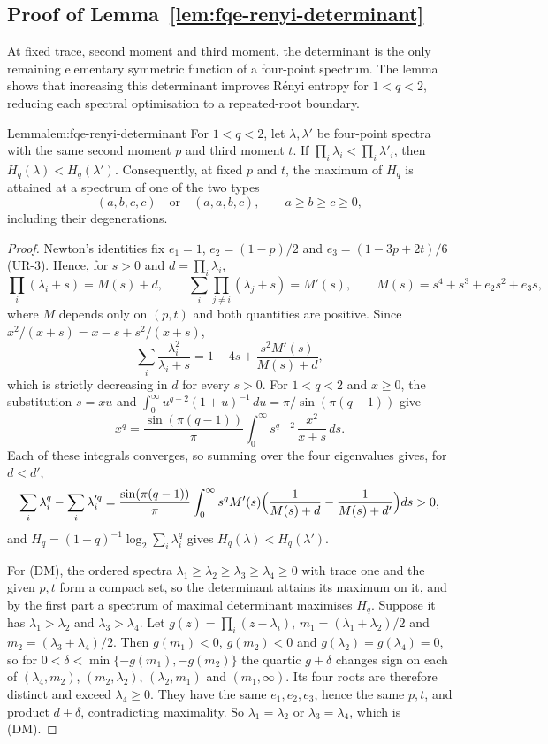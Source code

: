 \subsection{Proof of Lemma~\ref{lem:fqe-renyi-determinant}}\label{sec:sup-determinant}
At fixed trace, second moment and third moment, the determinant is the only
remaining elementary symmetric function of a four-point spectrum. The lemma
shows that increasing this determinant improves R\'enyi entropy for
$1<q<2$, reducing each spectral optimisation to a repeated-root boundary.
\begin{restated}{Lemma}{lem:fqe-renyi-determinant}
For $1<q<2$, let $\lambda,\lambda'$ be four-point spectra with the same second moment $p$ and third moment $t$.
If $\prod_i\lambda_i<\prod_i\lambda'_i$, then $H_q(\lambda)<H_q(\lambda')$.
Consequently, at fixed $p$ and $t$, the maximum of $H_q$ is attained at a spectrum of one of the two types
\[
(a,b,c,c)\quad\text{or}\quad(a,a,b,c),
\qquad a\ge b\ge c\ge0,
\tag{DM}
\]
including their degenerations.
\end{restated}
\begin{proof}
Newton's identities fix $e_1=1$, $e_2=(1-p)/2$ and $e_3=(1-3p+2t)/6$ (UR-3). Hence, for $s>0$ and $d=\prod_i\lambda_i$,
\[
 \prod_i(\lambda_i+s)=M(s)+d,\qquad \sum_i\prod_{j\ne i}(\lambda_j+s)=M'(s),\qquad M(s)=s^4+s^3+e_2s^2+e_3s,
\]
where $M$ depends only on $(p,t)$ and both quantities are positive. Since $x^2/(x+s)=x-s+s^2/(x+s)$,
\[
 \sum_i\frac{\lambda_i^2}{\lambda_i+s}=1-4s+\frac{s^2M'(s)}{M(s)+d},
\]
which is strictly decreasing in $d$ for every $s>0$. For $1<q<2$ and $x\ge0$, the substitution $s=xu$ and
$\int_0^\infty u^{q-2}(1+u)^{-1}\,du=\pi/\sin(\pi(q-1))$ give
\[
 x^q=\frac{\sin(\pi(q-1))}{\pi}\int_0^\infty s^{q-2}\,\frac{x^2}{x+s}\,ds .
\]
Each of these integrals converges, so summing over the four eigenvalues gives, for $d<d'$,
\[
 \sum_i\lambda_i^q-\sum_i\lambda_i'^q=\frac{\sin(\pi(q-1))}{\pi}\int_0^\infty s^{q}M'(s)
 \Bigl(\frac1{M(s)+d}-\frac1{M(s)+d'}\Bigr)ds>0,
\]
and $H_q=(1-q)^{-1}\log_2\sum_i\lambda_i^q$ gives $H_q(\lambda)<H_q(\lambda')$.

For (DM), the ordered spectra $\lambda_1\ge\lambda_2\ge\lambda_3\ge\lambda_4\ge0$ with trace one and the given $p,t$
form a compact set, so the determinant attains its maximum on it, and by the first part a spectrum of maximal
determinant maximises $H_q$. Suppose it has $\lambda_1>\lambda_2$ and $\lambda_3>\lambda_4$. Let
$g(z)=\prod_i(z-\lambda_i)$, $m_1=(\lambda_1+\lambda_2)/2$ and $m_2=(\lambda_3+\lambda_4)/2$. Then $g(m_1)<0$,
$g(m_2)<0$ and $g(\lambda_2)=g(\lambda_4)=0$, so for $0<\delta<\min\{-g(m_1),-g(m_2)\}$ the quartic $g+\delta$ changes
sign on each of $(\lambda_4,m_2)$, $(m_2,\lambda_2)$, $(\lambda_2,m_1)$ and $(m_1,\infty)$. Its four roots are therefore
distinct and exceed $\lambda_4\ge0$. They have the same $e_1,e_2,e_3$, hence the same $p,t$, and product $d+\delta$,
contradicting maximality. So $\lambda_1=\lambda_2$ or $\lambda_3=\lambda_4$, which is (DM).
\end{proof}

